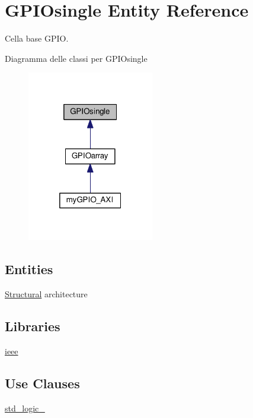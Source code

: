 \hypertarget{class_g_p_i_osingle}{\section{G\+P\+I\+Osingle Entity Reference}
\label{class_g_p_i_osingle}
}


Cella base G\+P\+I\+O.  




Diagramma delle classi per G\+P\+I\+Osingle\nopagebreak
\begin{figure}[H]
\begin{center}
\leavevmode
\includegraphics[width=157pt]{class_g_p_i_osingle__inherit__graph}
\end{center}
\end{figure}
\subsection*{Entities}
\begin{DoxyCompactItemize}
\item 
\hyperlink{class_g_p_i_osingle_1_1_structural}{Structural} architecture
\end{DoxyCompactItemize}
\subsection*{Libraries}
 \begin{DoxyCompactItemize}
\item 
\hypertarget{class_g_p_i_osingle_ga0a6af6eef40212dbaf130d57ce711256}{\hyperlink{group___g_p_i_o-single_ga0a6af6eef40212dbaf130d57ce711256}{ieee} }\label{class_g_p_i_osingle_ga0a6af6eef40212dbaf130d57ce711256}

\end{DoxyCompactItemize}
\subsection*{Use Clauses}
 \begin{DoxyCompactItemize}
\item 
\hypertarget{class_g_p_i_osingle_gacd03516902501cd1c7296a98e22c6fcb}{\hyperlink{group___g_p_i_o-single_gacd03516902501cd1c7296a98e22c6fcb}{std\+\_\+logic\+\_}   }\label{class_g_p_i_osingle_gacd03516902501cd1c7296a98e22c6fcb}

\end{DoxyCompactItemize}
